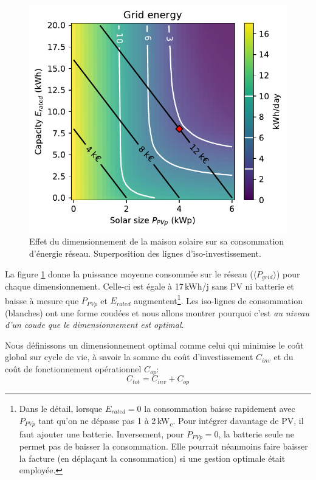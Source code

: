 \documentclass[a4paper,10pt,twocolumn]{article}
\providecommand{\avg}[1]{\langle#1\rangle}
\newcommand\sub[1]{\textsubscript{#1}}
\newcommand\kWc{kW\sub{c}{}} %
\begin{document}
\begin{figure}[!ht]
  \begin{center}
	  \includegraphics[width=0.8\columnwidth]{figures/Sizing_E_grid_invest_heatmap.pdf}
  \end{center}

  \caption{Effet du dimensionnement de la maison solaire sur sa consommation d'énergie réseau.
  Superposition des lignes d'iso-investissement.
  }
  \label{fig:P_grid_map}
\end{figure}

La figure \ref{fig:P_grid_map} donne la puissance moyenne consommée sur le réseau ($\avg{P_{grid}}$)
pour chaque dimensionnement. Celle-ci est égale à 17\,kWh/j sans PV ni batterie
et baisse à mesure que $P_{PVp}$ et $E_{rated}$ augmentent\footnote{
  Dans le détail,
  lorsque $E_{rated}=0$ la consommation baisse rapidement avec $P_{PVp}$
  tant qu'on ne dépasse pas 1 à 2\,\kWc. Pour intégrer davantage de PV,
  il faut ajouter une batterie.
  Inversement, pour $P_{PVp}=0$, la batterie seule ne permet pas de baisser la consommation.
  Elle pourrait néanmoins faire baisser la facture (en déplaçant la consommation)
  si une gestion optimale était employée.}.
Les iso-lignes de consommation (blanches) ont une forme coudées
et nous allons montrer pourquoi c'est \emph{au niveau d'un coude que le dimensionnement est optimal}.

Nous définissons un dimensionnement optimal comme celui qui minimise le coût global sur cycle de vie,
à savoir la somme du coût d'investissement $C_{inv}$
et du coût de fonctionnement opérationnel $C_{op}$:
%
\begin{equation} \label{eq:C_tot}
  C_{tot} = C_{inv} + C_{op}
\end{equation}
\end{document}
